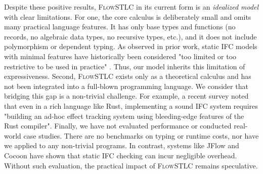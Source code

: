 \documentclass[conference]{IEEEtran}
\begin{document}
Despite these positive results, \textsc{FlowSTLC} in its current form is an \emph{idealized model} with clear limitations. For one, the core calculus is deliberately small and omits many practical language features. It has only base types and functions (no records, no algebraic data types, no recursive types, etc.), and it does not include polymorphism or dependent typing. As observed in prior work, static IFC models with minimal features have historically been considered "too limited or too restrictive to be used in practice" \cite{myers1999jflow}. Thus, our model inherits this limitation of expressiveness. Second, \textsc{FlowSTLC} exists only as a theoretical calculus and has not been integrated into a full-blown programming language. We consider that bridging this gap is a non-trivial challenge. For example, a recent survey noted that even in a rich language like Rust, implementing a sound IFC system requires "building an ad-hoc effect tracking system using bleeding-edge features of the Rust compiler". Finally, we have not evaluated performance or conducted real-world case studies. There are no benchmarks on typing or runtime costs, nor have we applied  to any non-trivial programs. In contrast, systems like JFlow and Cocoon \cite{lamba2024cocoon} have shown that static IFC checking can incur negligible overhead. Without such evaluation, the practical impact of \textsc{FlowSTLC} remains speculative.
\end{document}
